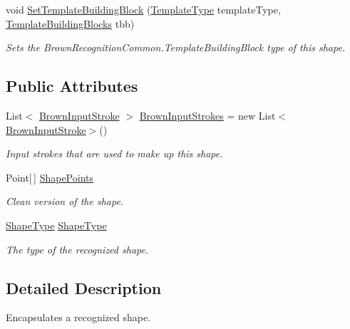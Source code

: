 \begin{DoxyCompactItemize}
void \hyperlink{class_brown_recognition_common_1_1_brown_shape_a8ee6024907fd2e673060bc01e9e5e74a}{\-Set\-Template\-Building\-Block} (\hyperlink{namespace_brown_recognition_common_a08ddb81441b8ac27fc140488e6dbb160}{\-Template\-Type} template\-Type, \hyperlink{namespace_brown_recognition_common_a7392e1ad819495147e6f96b995309138}{\-Template\-Building\-Blocks} tbb)
\begin{DoxyCompactList}\small\item\em \-Sets the \-Brown\-Recognition\-Common.\-Template\-Building\-Block type of this shape. \end{DoxyCompactList}\end{DoxyCompactItemize}
\subsection*{\-Public \-Attributes}
\begin{DoxyCompactItemize}
\item 
\-List$<$ \hyperlink{class_brown_recognition_common_1_1_brown_input_stroke}{\-Brown\-Input\-Stroke} $>$ \hyperlink{class_brown_recognition_common_1_1_brown_shape_aeebcf1af8e0ca904c82e1de618880d60}{\-Brown\-Input\-Strokes} = new \-List$<$\hyperlink{class_brown_recognition_common_1_1_brown_input_stroke}{\-Brown\-Input\-Stroke}$>$()
\begin{DoxyCompactList}\small\item\em \-Input strokes that are used to make up this shape. \end{DoxyCompactList}\item 
\-Point\mbox{[}$\,$\mbox{]} \hyperlink{class_brown_recognition_common_1_1_brown_shape_aabc4ccbd5ed1ba21c301b35d9f9d9fc9}{\-Shape\-Points}
\begin{DoxyCompactList}\small\item\em \-Clean version of the shape. \end{DoxyCompactList}\item 
\hyperlink{namespace_brown_recognition_common_a86340ddb3d90188573ed7b4484046ec3}{\-Shape\-Type} \hyperlink{class_brown_recognition_common_1_1_brown_shape_ac8d0e1108308d8e197d5c2b3bc248d7f}{\-Shape\-Type}
\begin{DoxyCompactList}\small\item\em \-The type of the recognized shape. \end{DoxyCompactList}\end{DoxyCompactItemize}


\subsection{\-Detailed \-Description}
\-Encapsulates a recognized shape. 



